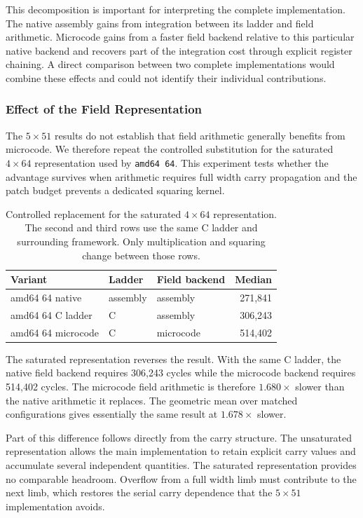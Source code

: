 \documentclass[journal=tches,submission]{iacrtrans}
\begin{document}
This decomposition is important for interpreting the complete implementation.
The native assembly gains from integration between its ladder and field arithmetic.
Microcode gains from a faster field backend relative to this particular native backend and recovers part of the integration cost through explicit register chaining.
A direct comparison between two complete implementations would combine these effects and could not identify their individual contributions.

\subsubsection{Effect of the Field Representation}
\label{sec}

The $5\times51$ results do not establish that field arithmetic generally benefits from microcode.
We therefore repeat the controlled substitution for the saturated $4\times64$ representation used by \texttt{amd64 64}.
This experiment tests whether the advantage survives when arithmetic requires full width carry propagation and the patch budget prevents a dedicated squaring kernel.

\begin{table}[!ht]
\centering
\caption{Controlled replacement for the saturated $4\times64$ representation.
The second and third rows use the same C ladder and surrounding framework.
Only multiplication and squaring change between those rows.}
\label{tab}
\footnotesize
\setlength{\tabcolsep}{4pt}
\begin{tabular}{@{}lllr@{}}
\toprule
Variant & Ladder & Field backend & Median \\
\midrule
amd64 64 native &
assembly &
assembly &
271,841 \\
amd64 64 C ladder &
C &
assembly &
306,243 \\
amd64 64 microcode &
C &
microcode &
514,402 \\
\bottomrule
\end{tabular}
\end{table}

The saturated representation reverses the result.
With the same C ladder, the native field backend requires 306,243 cycles while the microcode backend requires 514,402 cycles.
The microcode field arithmetic is therefore $1.680\times$ slower than the native arithmetic it replaces.
The geometric mean over matched configurations gives essentially the same result at $1.678\times$ slower.

Part of this difference follows directly from the carry structure.
The unsaturated representation allows the main implementation to retain explicit carry values and accumulate several independent quantities.
The saturated representation provides no comparable headroom.
Overflow from a full width limb must contribute to the next limb, which restores the serial carry dependence that the $5\times51$ implementation avoids.
\end{document}
